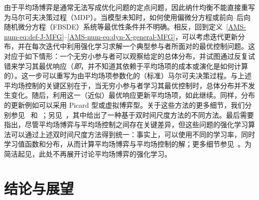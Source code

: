 \documentclass{amsproc}
\theoremstyle{definition}
\theoremstyle{remark}
\numberwithin{equation}{section}
\begin{document}
由于平均场博弈是通常无法写成优化问题的定点问题，因此纳什均衡不能直接重写为马尔可夫决策过程（MDP）。当模型未知时，如何使用偏微分方程或前向--后向随机微分方程（FBSDE）系统等最优性条件并不明确。相反，回到定义~\eqref{AMS-num-eq:def-J-MFG}--\eqref{AMS-num-eq:dyn-X-general-MFG}，可以考虑迭代更新分布，并在每次迭代中利用强化学习求解一个典型参与者所面对的最优控制问题。这对应于如下情形：一个无穷小参与者可以观察给定的总体分布，并试图通过反复试错来学习其最优响应（\textit{即}，并不知道其依赖于平均场项的成本或演化是如何计算的）。这一步可以重写为由平均场项参数化的（标准）马尔可夫决策过程。与上述平均场控制的关键区别在于，当无穷小参与者学习其最优控制时，总体分布并不发生变化。随后，利用这一（近似）最优响应更新平均场项，如此继续。同样，分布的更新例如可以采用 Picard 型或虚拟博弈型。关于这些方法的更多细节，我们分别参见~\cite{guo2019learning} 和~\cite{Elie2020OnTC,perrin2020fictitious}；另见~\cite{subramanianpolicy}，其中给出了一种基于双时间尺度方法的不同方法。最后需要指出，尽管平均场博弈与平均场控制之间存在关键差异，但这些问题的强化学习算法可以通过上述双时间尺度方法得到统一：事实上，可以使用不同的学习率，同时学习值函数和分布，从而计算平均场博弈与平均场控制的解；更多细节参见~\cite{angiulifouquelauriere2020unified}。为简洁起见，此处不再展开讨论平均场博弈的强化学习。





\clearpage

\section{\bf 结论与展望}
\label{sec:conclusion}
\end{document}

